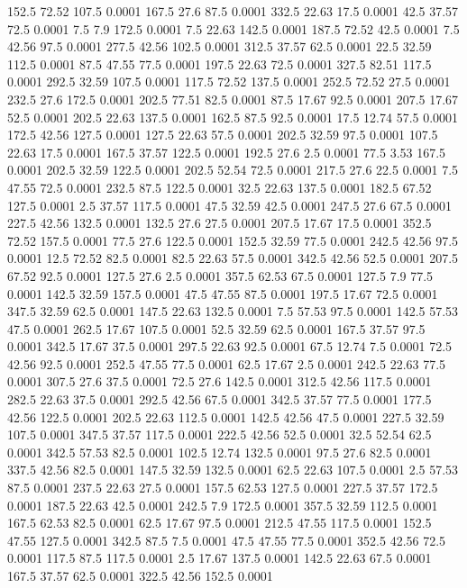 152.5	72.52	107.5	0.0001
167.5	27.6	87.5	0.0001
332.5	22.63	17.5	0.0001
42.5	37.57	72.5	0.0001
7.5	7.9	172.5	0.0001
7.5	22.63	142.5	0.0001
187.5	72.52	42.5	0.0001
7.5	42.56	97.5	0.0001
277.5	42.56	102.5	0.0001
312.5	37.57	62.5	0.0001
22.5	32.59	112.5	0.0001
87.5	47.55	77.5	0.0001
197.5	22.63	72.5	0.0001
327.5	82.51	117.5	0.0001
292.5	32.59	107.5	0.0001
117.5	72.52	137.5	0.0001
252.5	72.52	27.5	0.0001
232.5	27.6	172.5	0.0001
202.5	77.51	82.5	0.0001
87.5	17.67	92.5	0.0001
207.5	17.67	52.5	0.0001
202.5	22.63	137.5	0.0001
162.5	87.5	92.5	0.0001
17.5	12.74	57.5	0.0001
172.5	42.56	127.5	0.0001
127.5	22.63	57.5	0.0001
202.5	32.59	97.5	0.0001
107.5	22.63	17.5	0.0001
167.5	37.57	122.5	0.0001
192.5	27.6	2.5	0.0001
77.5	3.53	167.5	0.0001
202.5	32.59	122.5	0.0001
202.5	52.54	72.5	0.0001
217.5	27.6	22.5	0.0001
7.5	47.55	72.5	0.0001
232.5	87.5	122.5	0.0001
32.5	22.63	137.5	0.0001
182.5	67.52	127.5	0.0001
2.5	37.57	117.5	0.0001
47.5	32.59	42.5	0.0001
247.5	27.6	67.5	0.0001
227.5	42.56	132.5	0.0001
132.5	27.6	27.5	0.0001
207.5	17.67	17.5	0.0001
352.5	72.52	157.5	0.0001
77.5	27.6	122.5	0.0001
152.5	32.59	77.5	0.0001
242.5	42.56	97.5	0.0001
12.5	72.52	82.5	0.0001
82.5	22.63	57.5	0.0001
342.5	42.56	52.5	0.0001
207.5	67.52	92.5	0.0001
127.5	27.6	2.5	0.0001
357.5	62.53	67.5	0.0001
127.5	7.9	77.5	0.0001
142.5	32.59	157.5	0.0001
47.5	47.55	87.5	0.0001
197.5	17.67	72.5	0.0001
347.5	32.59	62.5	0.0001
147.5	22.63	132.5	0.0001
7.5	57.53	97.5	0.0001
142.5	57.53	47.5	0.0001
262.5	17.67	107.5	0.0001
52.5	32.59	62.5	0.0001
167.5	37.57	97.5	0.0001
342.5	17.67	37.5	0.0001
297.5	22.63	92.5	0.0001
67.5	12.74	7.5	0.0001
72.5	42.56	92.5	0.0001
252.5	47.55	77.5	0.0001
62.5	17.67	2.5	0.0001
242.5	22.63	77.5	0.0001
307.5	27.6	37.5	0.0001
72.5	27.6	142.5	0.0001
312.5	42.56	117.5	0.0001
282.5	22.63	37.5	0.0001
292.5	42.56	67.5	0.0001
342.5	37.57	77.5	0.0001
177.5	42.56	122.5	0.0001
202.5	22.63	112.5	0.0001
142.5	42.56	47.5	0.0001
227.5	32.59	107.5	0.0001
347.5	37.57	117.5	0.0001
222.5	42.56	52.5	0.0001
32.5	52.54	62.5	0.0001
342.5	57.53	82.5	0.0001
102.5	12.74	132.5	0.0001
97.5	27.6	82.5	0.0001
337.5	42.56	82.5	0.0001
147.5	32.59	132.5	0.0001
62.5	22.63	107.5	0.0001
2.5	57.53	87.5	0.0001
237.5	22.63	27.5	0.0001
157.5	62.53	127.5	0.0001
227.5	37.57	172.5	0.0001
187.5	22.63	42.5	0.0001
242.5	7.9	172.5	0.0001
357.5	32.59	112.5	0.0001
167.5	62.53	82.5	0.0001
62.5	17.67	97.5	0.0001
212.5	47.55	117.5	0.0001
152.5	47.55	127.5	0.0001
342.5	87.5	7.5	0.0001
47.5	47.55	77.5	0.0001
352.5	42.56	72.5	0.0001
117.5	87.5	117.5	0.0001
2.5	17.67	137.5	0.0001
142.5	22.63	67.5	0.0001
167.5	37.57	62.5	0.0001
322.5	42.56	152.5	0.0001
